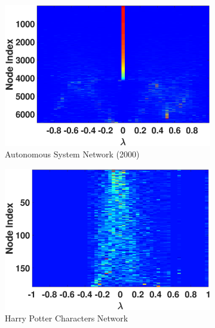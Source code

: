 \begin{figure}[htp]
\begin{subfigure}[t]{0.19\textwidth}
    \includegraphics[width=\textwidth,trim = .4cm 0.5cm 3.5cm 1.3cm,clip]
    {./ndos/pics/as20000102_ldos}
    \caption{Autonomous System Network (2000)}
    \label{fig:as2_ldos}
  \end{subfigure}
  \begin{subfigure}[t]{0.19\textwidth}
    \centering  
    \captionsetup{justification=centering,font=scriptsize}
    \includegraphics[width=\textwidth,trim = .4cm 0.5cm 3.5cm 1.3cm,clip]
    {./ndos/pics/hp_ldos}{}
    \caption{Harry Potter Characters Network}
    \label{fig:hp_ldos}
  \end{subfigure}
  \begin{subfigure}[t]{0.19\textwidth}
    \centering  
    \captionsetup{justification=centering,font=scriptsize}

\end{subfigure}
\end{figure}

